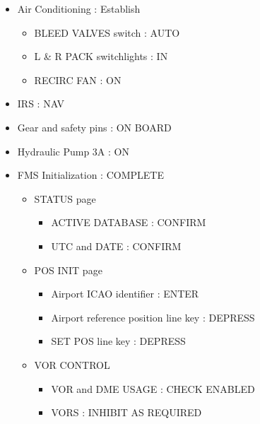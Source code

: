 \begin{itemize}
\begin{itemize}
\end{itemize}

\item Air Conditioning : Establish

\begin{itemize}
\item BLEED VALVES switch : AUTO

\item L \& R PACK switchlights : IN

\item RECIRC FAN : ON

\end{itemize}

\item IRS : NAV

\item Gear and safety pins : ON BOARD

\item Hydraulic Pump 3A : ON

\item FMS Initialization : COMPLETE

\begin{itemize}
\item STATUS page

\begin{itemize}
\item ACTIVE DATABASE : CONFIRM

\item UTC and DATE : CONFIRM

\end{itemize}

\item POS INIT page

\begin{itemize}
\item Airport ICAO identifier : ENTER

\item Airport reference position line key : DEPRESS

\item SET POS line key : DEPRESS

\end{itemize}

\item VOR CONTROL

\begin{itemize}
\item VOR and DME USAGE : CHECK ENABLED

\item VORS : INHIBIT AS REQUIRED


\end{itemize}
\end{itemize}
\end{itemize}
